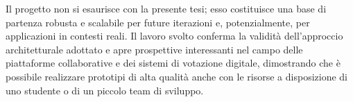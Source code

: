 Il progetto non si esaurisce con la presente tesi; esso costituisce una base di partenza robusta e scalabile per future iterazioni e, potenzialmente, per applicazioni in contesti reali.
Il lavoro svolto conferma la validità dell'approccio architetturale adottato e apre prospettive interessanti nel campo delle piattaforme collaborative e dei sistemi di votazione digitale, dimostrando che è possibile realizzare prototipi di alta qualità anche con le risorse a disposizione di uno studente o di un piccolo team di sviluppo.